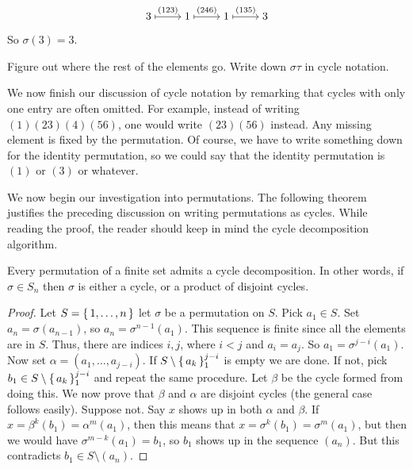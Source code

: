 \documentclass[./main.tex]{subfiles}
\begin{document}
\[\begin{tikzcd}[cramped]
	3 & 1 & 1 & 3
	\arrow["{(123)}", maps to, from=1-1, to=1-2]
	\arrow["{(246)}", maps to, from=1-2, to=1-3]
	\arrow["{(135)}", maps to, from=1-3, to=1-4]
\end{tikzcd}\]

So $\sigma(3) = 3$.

\begin{exercise}
    Figure out where the rest of the elements go. Write down $\sigma \tau$ in
    cycle notation.
\end{exercise}

We now finish our discussion of cycle notation by remarking that cycles with
only one entry are often omitted. For example, instead of writing
$(1)(23)(4)(56)$, one would write $(23)(56)$ instead. Any missing element is
fixed by the permutation. Of course, we have to write something down for the
identity permutation, so we could say that the identity permutation is $(1)$ or
$(3)$ or whatever.

We now begin our investigation into permutations. The following theorem
justifies the preceding discussion on writing permutations as cycles. While
reading the proof, the reader should keep in mind the cycle decomposition
algorithm.
\begin{theorem}
\label{thm:existence-of-cycle-decomp}
    Every permutation of a finite set admits a cycle decomposition. In other
    words, if $\sigma \in S_n$ then $\sigma$ is either a cycle, or a product of
    disjoint cycles.
\end{theorem}
\begin{proof}
    Let $S = \set{1, \dots, n}$ let $\sigma$ be a permutation on $S$. Pick $a_1
    \in S$. Set $a_n = \sigma (a_{n-1})$, so $a_n = \sigma^{n-1} (a_1)$. This
    sequence is finite since all the elements are in $S$. Thus, there are
    indices $i, j$, where $i < j$ and $a_i = a_j$. So $a_1 = \sigma^{j-i}
    (a_1)$. Now set $\alpha = (a_1, \dots, a_{j-i})$. If $S \setminus
    \set{a_k}_1^{j-i}$ is empty we are done. If not, pick $b_1 \in S \setminus
    \set{a_k}_1^{j-i}$ and repeat the same procedure. Let $\beta$ be the cycle
    formed from doing this. We now prove that $\beta$ and $\alpha$ are disjoint
    cycles (the general case follows easily). Suppose not. Say $x$ shows up in
    both $\alpha$ and $\beta$. If $x = \beta^k(b_1) = \alpha^m(a_1)$, then this
    means that $x = \sigma^k(b_1) = \sigma^m (a_1)$, but then we would have
    $\sigma^{m-k}(a_1) = b_1$, so $b_1$ shows up in the sequence $(a_n)$. But
    this contradicts $b_1 \in S \setminus (a_n)$.
\end{proof}
\end{document}
